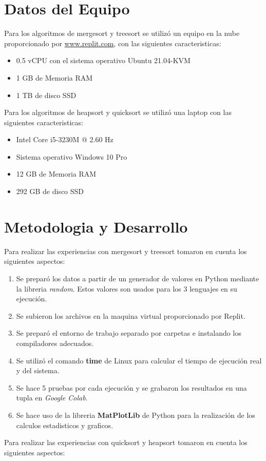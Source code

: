 \documentclass{article}
\begin{document}
    
    
    
    \section{Datos del Equipo}
    Para los algoritmos de mergesort y treesort se utilizó un equipo en la nube proporcionado por \href{https://replit.com/~}{www.replit.com}, con las siguientes caracteristicas:

    \begin{itemize}
        \item 0.5 vCPU con el sistema operativo Ubuntu 21.04-KVM
        \item 1 GB de Memoria RAM
        \item 1 TB de disco SSD
    \end{itemize}

	Para los algoritmos de heapsort y quicksort se utilizó una laptop con las siguientes caracteristicas:
	
	\begin{itemize}
		\item Intel Core i5-3230M @ 2.60 Hz
		\item Sistema operativo Windows 10 Pro
		\item 12 GB de Memoria RAM
		\item 292 GB de disco SSD
	\end{itemize}

    \section{Metodologia y Desarrollo}
    Para realizar las experiencias con mergesort y treesort tomaron en cuenta los siguientes aspectos:
    
    \begin{enumerate}
        \item Se preparó los datos a partir de un generador de valores en Python mediante la libreria \textit{random}. Estos valores son usados para los 3 lenguajes en su ejecución.
        \item Se subieron los archivos en la maquina virtual proporcionado por Replit.
        \item Se preparó el entorno de trabajo separado por carpetas e instalando los compiladores adecuados.
        \item Se utilizó el comando \textbf{time} de Linux para calcular el tiempo de ejecución real y del sistema.
        \item Se hace 5 pruebas por cada ejecución y se grabaron los resultados en una tupla en \textit{Google Colab}.
        \item Se hace uso de la libreria \textbf{MatPlotLib} de Python para la realización de los calculos estadisticos y graficos.
    \end{enumerate}
	Para realizar las experiencias con quicksort y heapsort tomaron en cuenta los siguientes aspectos:
	
\end{document}
